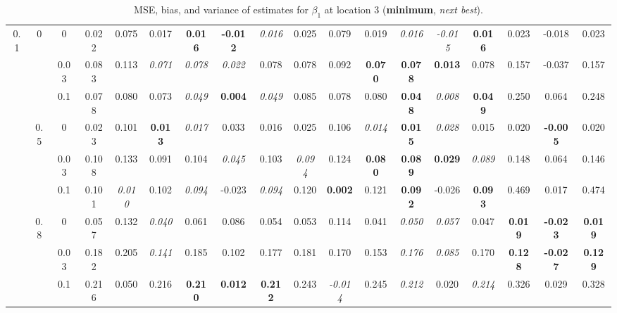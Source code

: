 \documentclass[authoryear, review, 10pt]{elsarticle}
\begin{document}
\begin{sidewaystable}[ht]
\begin{center}
\begin{tabular}{ccc|ccc|ccc|ccc|ccc|ccc}
\multirow{9}{*}{0.1} & \multirow{3}{*}{0} & 0 &   0.022 & 0.075 & 0.017 & \textbf{0.016} & \textbf{-0.012} & \emph{0.016} & 0.025 & 0.079 & 0.019 & \emph{0.016} & \emph{-0.015} & \textbf{0.016} & 0.023 & -0.018 & 0.023 \\ 
 &  & 0.03 &   0.083 & 0.113 & \emph{0.071} & \emph{0.078} & \emph{0.022} & 0.078 & 0.078 & 0.092 & \textbf{0.070} & \textbf{0.078} & \textbf{0.013} & 0.078 & 0.157 & -0.037 & 0.157 \\ 
 &  & 0.1 &   0.078 & 0.080 & 0.073 & \emph{0.049} & \textbf{0.004} & \emph{0.049} & 0.085 & 0.078 & 0.080 & \textbf{0.048} & \emph{0.008} & \textbf{0.049} & 0.250 & 0.064 & 0.248 \\ \cline{2-18}
 & \multirow{3}{*}{0.5} & 0 &   0.023 & 0.101 & \textbf{0.013} & \emph{0.017} & 0.033 & 0.016 & 0.025 & 0.106 & \emph{0.014} & \textbf{0.015} & \emph{0.028} & 0.015 & 0.020 & \textbf{-0.005} & 0.020 \\ 
 &  & 0.03 &   0.108 & 0.133 & 0.091 & 0.104 & \emph{0.045} & 0.103 & \emph{0.094} & 0.124 & \textbf{0.080} & \textbf{0.089} & \textbf{0.029} & \emph{0.089} & 0.148 & 0.064 & 0.146 \\ 
 &  & 0.1 &   0.101 & \emph{0.010} & 0.102 & \emph{0.094} & -0.023 & \emph{0.094} & 0.120 & \textbf{0.002} & 0.121 & \textbf{0.092} & -0.026 & \textbf{0.093} & 0.469 & 0.017 & 0.474 \\ \cline{2-18}
 & \multirow{3}{*}{0.8} & 0 &   0.057 & 0.132 & \emph{0.040} & 0.061 & 0.086 & 0.054 & 0.053 & 0.114 & 0.041 & \emph{0.050} & \emph{0.057} & 0.047 & \textbf{0.019} & \textbf{-0.023} & \textbf{0.019} \\ 
 &  & 0.03 &   0.182 & 0.205 & \emph{0.141} & 0.185 & 0.102 & 0.177 & 0.181 & 0.170 & 0.153 & \emph{0.176} & \emph{0.085} & 0.170 & \textbf{0.128} & \textbf{-0.027} & \textbf{0.129} \\ 
 &  & 0.1 &   0.216 & 0.050 & 0.216 & \textbf{0.210} & \textbf{0.012} & \textbf{0.212} & 0.243 & \emph{-0.014} & 0.245 & \emph{0.212} & 0.020 & \emph{0.214} & 0.326 & 0.029 & 0.328 \\ 
  \end{tabular}
\caption{MSE, bias, and variance of estimates for $\beta_1$ at location 3 (\textbf{minimum}, \emph{next best}).}
\end{center}
\end{sidewaystable}
\end{document}
